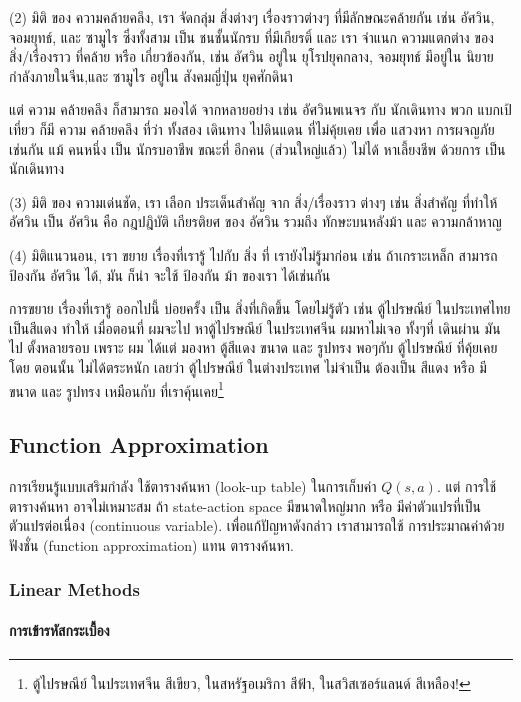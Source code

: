 (2) มิติ ของ ความคล้ายคลึง, เรา จัดกลุ่ม สิ่งต่างๆ เรื่องราวต่างๆ ที่มีลักษณะคล้ายกัน เช่น อัศวิน, จอมยุทธ์, และ ซามูไร ซึ่งทั้งสาม เป็น ชนชั้นนักรบ ที่มีเกียรติ์
%
และ เรา จำแนก ความแตกต่าง ของ สิ่ง/เรื่องราว ที่คล้าย หรือ เกี่ยวข้องกัน, เช่น อัศวิน อยู่ใน ยุโรปยุคกลาง, จอมยุทธ์ มีอยู่ใน นิยายกำลังภายในจีน,และ ซามูไร อยู่ใน สังคมญี่ปุ่น ยุคศักดินา

แต่ ความ คล้ายคลึง ก็สามารถ มองได้ จากหลายอย่าง เช่น อัศวินพเนจร กับ นักเดินทาง พวก แบกเป้ เที่ยว ก็มี ความ คล้ายคลึง ที่ว่า ทั้งสอง เดินทาง ไปดินแดน ที่ไม่คุ้ยเคย เพื่อ แสวงหา การผจญภัย เช่นกัน แม้ คนหนึ่ง เป็น นักรบอาชีพ ขณะที่ อีกคน (ส่วนใหญ่แล้ว) ไม่ได้ หาเลี้ยงชีพ ด้วยการ เป็นนักเดินทาง

(3) มิติ ของ ความเด่นชัด, เรา เลือก ประเด็นสำคัญ จาก สิ่ง/เรื่องราว ต่างๆ เช่น สิ่งสำคัญ ที่ทำให้ อัศวิน เป็น อัศวิน คือ กฎปฎิบัติ เกียรติยศ ของ อัศวิน รวมถึง ทักษะบนหลังม้า และ ความกล้าหาญ

(4) มิติแนวนอน, เรา ขยาย เรื่องที่เรารู้ ไปกับ สิ่ง ที่ เรายังไม่รู้มาก่อน เช่น ถ้าเกราะเหล็ก สามารถ ป้องกัน อัศวิน ได้, มัน ก็น่า จะใช้ ป้องกัน ม้า ของเรา ได้เช่นกัน

การขยาย เรื่องที่เรารู้ ออกไปนี้ บ่อยครั้ง เป็น สิ่งที่เกิดขึ้น โดยไม่รู้ตัว เช่น ตู้ไปรษณีย์ ในประเทศไทย เป็นสีแดง ทำให้ เมื่อตอนที่ ผมจะไป หาตู้ไปรษณีย์ ในประเทศจีน ผมหาไม่เจอ ทั้งๆที่ เดินผ่าน มัน ไป ตั้งหลายรอบ เพราะ ผม ได้แต่ มองหา ตู้สีแดง ขนาด และ รูปทรง พอๆกับ ตู้ไปรษณีย์ ที่คุ้ยเคย โดย ตอนนั้น ไม่ได้ตระหนัก เลยว่า ตู้ไปรษณีย์ ในต่างประเทศ ไม่จำเป็น ต้องเป็น สีแดง หรือ มีขนาด และ รูปทรง เหมือนกับ ที่เราคุ้นเคย\footnote{ตู้ไปรษณีย์ ในประเทศจีน สีเขียว, ในสหรัฐอเมริกา สีฟ้า, ในสวิสเซอร์แลนด์ สีเหลือง!}


\subsection{Function Approximation}

การเรียนรู้แบบเสริมกำลัง ใช้ตารางค้นหา (look-up table) ในการเก็บค่า $Q(s,a)$.
แต่ การใช้ ตารางค้นหา อาจไม่เหมาะสม ถ้า state-action space มีขนาดใหญ่มาก หรือ มีค่าตัวแปรที่เป็น ตัวแปรต่อเนื่อง (continuous variable).
เพื่อแก้ปัญหาดังกล่าว เราสามารถใช้ การประมาณค่าด้วยฟังชั่น (function approximation) แทน ตารางค้นหา.

\subsubsection{Linear Methods}


\paragraph{การเข้ารหัสกระเบื้อง}

